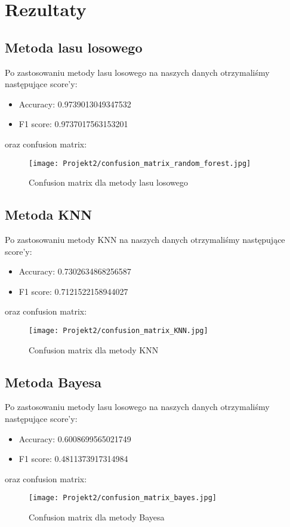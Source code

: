\documentclass{article}
\begin{document}
\section{Rezultaty}
\subsection{Metoda lasu losowego}
Po zastosowaniu metody lasu losowego na naszych danych otrzymaliśmy następujące score'y:

\begin{itemize}
    \item Accuracy: 0.9739013049347532
    \item F1 score: 0.9737017563153201
\end{itemize}
oraz confusion matrix:
\begin{figure}[H]
    \centering
    \texttt{[image: Projekt2/confusion\_matrix\_random\_forest.jpg]}
    \caption{Confusion matrix dla metody lasu losowego}
    \label{fig:enter-label}
\end{figure}

\subsection{Metoda KNN}
Po zastosowaniu metody KNN na naszych danych otrzymaliśmy następujące score'y:

\begin{itemize}
    \item Accuracy: 0.7302634868256587
    \item F1 score: 0.7121522158944027
\end{itemize}
oraz confusion matrix:
\begin{figure}[H]
    \centering
    \texttt{[image: Projekt2/confusion\_matrix\_KNN.jpg]}
    \caption{Confusion matrix dla metody KNN}
    \label{fig:enter-label}
\end{figure}

\subsection{Metoda Bayesa}
Po zastosowaniu metody lasu losowego na naszych danych otrzymaliśmy następujące score'y:

\begin{itemize}
    \item Accuracy: 0.6008699565021749
    \item F1 score: 0.4811373917314984
\end{itemize}
oraz confusion matrix:
\begin{figure}[H]
    \centering
    \texttt{[image: Projekt2/confusion\_matrix\_bayes.jpg]}
    \caption{Confusion matrix dla metody Bayesa}
    \label{fig:enter-label}
\end{figure}
\end{document}

